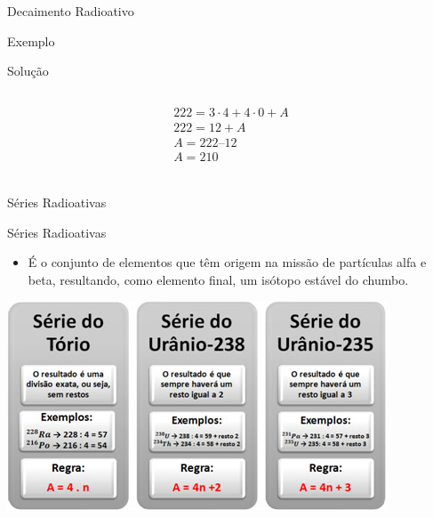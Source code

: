 \documentclass[presentation]{beamer}
\begin{document}
\begin{frame}[label={sec:org4501f1e}]{Decaimento Radioativo}
\begin{block}{}
\begin{boxex}{Exemplo}
\begin{myrule}{Solução}
\begin{columns}[T]
\begin{column}{.48\textwidth}
\begin{align*}
222 = 3 \cdot 4 + 4\cdot 0 + A \\
222 = 12 + A \\
A = 222 – 12 \\ 
A = 210 \\ 
\end{align*}
\end{column}%
\end{columns}
\end{myrule}
\end{boxex}
\end{block}
\end{frame}





\begin{frame}[label={sec:orgbd8f1e7}]{Séries Radioativas}
\begin{block}{Séries Radioativas}
\begin{itemize}
\item É o conjunto de elementos que têm origem na missão de partículas alfa e beta, resultando, como elemento final, um isótopo estável do chumbo.
\end{itemize}
\begin{center}
\includegraphics[width=.9\linewidth]{./serieradioativas.jpg}
\end{center}
\end{block}
\end{frame}
\end{document}
